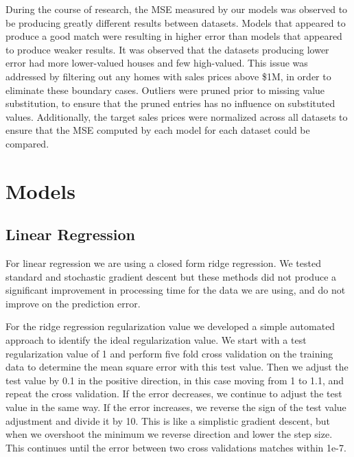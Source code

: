 \documentclass[10pt]{article}
\begin{document}
\begin{multicols}{2}
        During the course of research, the MSE measured by our models was observed to be producing greatly different results between datasets. Models that appeared to produce a good match were resulting in higher error than models that appeared to produce weaker results. It was observed that the datasets producing lower error had more lower-valued houses and few high-valued. This issue was addressed by filtering out any homes with sales prices above \$1M, in order to eliminate these boundary cases. Outliers were pruned prior to missing value substitution, to ensure that the pruned entries has no influence on substituted values. Additionally, the target sales prices were normalized across all datasets to ensure that the MSE computed by each model for each dataset could be compared.
        
 		\section{Models}
		\subsection{Linear Regression}
		For linear regression we are using a closed form ridge regression. We tested standard and stochastic gradient descent but these methods did not produce a significant improvement in processing time for the data we are using, and do not improve on the prediction error.

		For the ridge regression regularization value we developed a simple automated approach to identify the ideal regularization value. We start with a test regularization value of 1 and perform five fold cross validation on the training data to determine the mean square error with this test value. Then we adjust the test value by 0.1 in the positive direction, in this case moving from 1 to 1.1, and repeat the cross validation. If the error decreases, we continue to adjust the test value in the same way. If the error increases, we reverse the sign of the test value adjustment and divide it by 10. This is like a simplistic gradient descent, but when we overshoot the minimum we reverse direction and lower the step size. This continues until the error between two cross validations matches within 1e-7.


\end{multicols}
\end{document}
